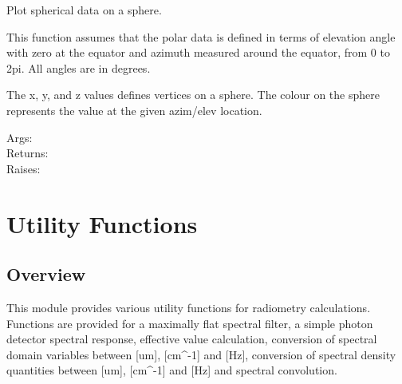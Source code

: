 \documentclass[a4paper,10pt,english]{sphinxmanual}
\begin{document}

\begin{fulllineitems}
\label{ryplotspherical:pyradi.ryplotspherical.plotVertexSphere}
Plot spherical data on a sphere.

This function assumes that the polar data is defined in terms of elevation
angle with zero at the equator and azimuth measured around the equator,
from 0 to 2pi.  All angles are in degrees.

The x, y, and z values defines vertices on a sphere. The colour on the
sphere represents the value at the given azim/elev location.
\begin{description}
\item[{Args:}] \leavevmode
{}

\item[{Returns:}] \leavevmode
{}

\item[{Raises:}] \leavevmode
{}

\end{description}

\end{fulllineitems}



\chapter{Utility Functions}
\label{ryutils::doc}\label{ryutils:utility-functions}

\section{Overview}
\label{ryutils:overview}\label{ryutils:module-pyradi.ryutils}
This module provides various utility functions for radiometry calculations.
Functions are provided for a maximally flat spectral filter, a simple photon
detector spectral response, effective value calculation, conversion of spectral
domain variables between {[}um{]}, {[}cm\textasciicircum{}-1{]} and {[}Hz{]}, conversion of spectral
density quantities between {[}um{]}, {[}cm\textasciicircum{}-1{]} and {[}Hz{]} and spectral convolution.
\end{document}
